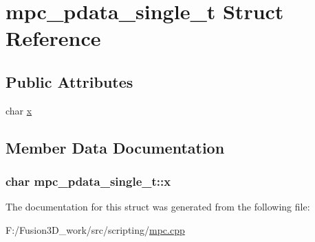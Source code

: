 \hypertarget{structmpc__pdata__single__t}{}\section{mpc\+\_\+pdata\+\_\+single\+\_\+t Struct Reference}
\label{structmpc__pdata__single__t}
\subsection*{Public Attributes}
\begin{DoxyCompactItemize}
\item 
char \hyperlink{structmpc__pdata__single__t_a91f7327449af33409b67664de4ea560c}{x}
\end{DoxyCompactItemize}


\subsection{Member Data Documentation}
\hypertarget{structmpc__pdata__single__t_a91f7327449af33409b67664de4ea560c}{}
\subsubsection[{x}]{\setlength{\rightskip}{0pt plus 5cm}char mpc\+\_\+pdata\+\_\+single\+\_\+t\+::x}\label{structmpc__pdata__single__t_a91f7327449af33409b67664de4ea560c}


The documentation for this struct was generated from the following file\+:\begin{DoxyCompactItemize}
\item 
F\+:/\+Fusion3\+D\+\_\+work/src/scripting/\hyperlink{mpc_8cpp}{mpc.\+cpp}\end{DoxyCompactItemize}

